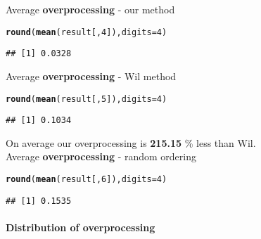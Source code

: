 \documentclass{article}\usepackage[]{graphicx}\usepackage[]{color}
\makeatletter
\newcommand{\hlnum}[1]{\textcolor[rgb]{0.686,0.059,0.569}{#1}}%
\newcommand{\hlstd}[1]{\textcolor[rgb]{0.345,0.345,0.345}{#1}}%
\newcommand{\hlkwc}[1]{\textcolor[rgb]{0.333,0.667,0.333}{#1}}%
\newcommand{\hlkwd}[1]{\textcolor[rgb]{0.737,0.353,0.396}{\textbf{#1}}}%
\newenvironment{kframe}{%
 \def\at@end@of@kframe{}%
 \ifinner\ifhmode%
  \def\at@end@of@kframe{\end{minipage}}%
  \begin{minipage}{\columnwidth}%
 \fi\fi%
 \def\FrameCommand##1{\hskip\@totalleftmargin \hskip-\fboxsep
 \colorbox{shadecolor}{##1}\hskip-\fboxsep
     \hskip-\linewidth \hskip-\@totalleftmargin \hskip\columnwidth}%
 \MakeFramed {\advance\hsize-\width
   \@totalleftmargin\z@ \linewidth\hsize
   \@setminipage}}%
 {\par\unskip\endMakeFramed%
 \at@end@of@kframe}
\newenvironment{knitrout}{}{} %
\makeatother
\begin{document}
Average \textbf{overprocessing} - our method

\begin{knitrout}
\color{fgcolor}\begin{kframe}
\begin{alltt}
\hlkwd{round}\hlstd{(}\hlkwd{mean}\hlstd{(result[,}\hlnum{4}\hlstd{]),}\hlkwc{digits} \hlstd{=} \hlnum{4}\hlstd{)}
\end{alltt}
\begin{verbatim}
## [1] 0.0328
\end{verbatim}
\end{kframe}
\end{knitrout}

Average \textbf{overprocessing} - Wil method

\begin{knitrout}
\color{fgcolor}\begin{kframe}
\begin{alltt}
\hlkwd{round}\hlstd{(}\hlkwd{mean}\hlstd{(result[,}\hlnum{5}\hlstd{]),}\hlkwc{digits} \hlstd{=} \hlnum{4}\hlstd{)}
\end{alltt}
\begin{verbatim}
## [1] 0.1034
\end{verbatim}
\end{kframe}
\end{knitrout}


 
On average our overprocessing is \textbf{215.15} \% less than Wil. \\

Average \textbf{overprocessing} - random ordering

\begin{knitrout}
\color{fgcolor}\begin{kframe}
\begin{alltt}
\hlkwd{round}\hlstd{(}\hlkwd{mean}\hlstd{(result[,}\hlnum{6}\hlstd{]),}\hlkwc{digits} \hlstd{=} \hlnum{4}\hlstd{)}
\end{alltt}
\begin{verbatim}
## [1] 0.1535
\end{verbatim}
\end{kframe}
\end{knitrout}

\paragraph{Distribution of overprocessing}
\end{document}

